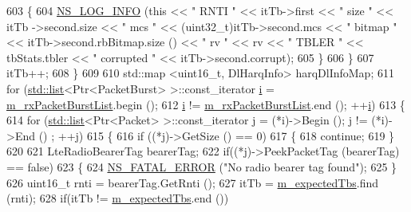 \begin{DoxyCode}
603                         \{
604                                 \hyperlink{group__logging_gafbd73ee2cf9f26b319f49086d8e860fb}{NS\_LOG\_INFO} (\textcolor{keyword}{this} << \textcolor{stringliteral}{" RNTI "} << itTb->first << \textcolor{stringliteral}{" size "} << itTb
      ->second.size << \textcolor{stringliteral}{" mcs "} << (uint32\_t)itTb->second.mcs << \textcolor{stringliteral}{" bitmap "} << itTb->second.rbBitmap.size () << \textcolor{stringliteral}{"
       rv "} << rv << \textcolor{stringliteral}{" TBLER "} << tbStats.tbler << \textcolor{stringliteral}{" corrupted "} << itTb->second.corrupt);
605                         \}
606                 \}
607                 itTb++;
608         \}
609 
610         std::map <uint16\_t, DlHarqInfo> harqDlInfoMap;
611         \textcolor{keywordflow}{for} (\hyperlink{openflow-interface_8h_afd9bcfa176617760671b67580f536fa7}{std::list}<Ptr<PacketBurst> >::const\_iterator \hyperlink{bernuolliDistribution_8m_a6f6ccfcf58b31cb6412107d9d5281426}{i} = 
      \hyperlink{classns3_1_1MmWaveSpectrumPhy_ab57ce6deb73d1e7032276863528fa320}{m\_rxPacketBurstList}.begin ();
612                         \hyperlink{bernuolliDistribution_8m_a6f6ccfcf58b31cb6412107d9d5281426}{i} != \hyperlink{classns3_1_1MmWaveSpectrumPhy_ab57ce6deb73d1e7032276863528fa320}{m\_rxPacketBurstList}.end (); ++\hyperlink{bernuolliDistribution_8m_a6f6ccfcf58b31cb6412107d9d5281426}{i})
613         \{
614                 \textcolor{keywordflow}{for} (\hyperlink{openflow-interface_8h_afd9bcfa176617760671b67580f536fa7}{std::list}<Ptr<Packet> >::const\_iterator j = (*i)->Begin (); j != (*i)->End ()
      ; ++j)
615                 \{
616                         \textcolor{keywordflow}{if} ((*j)->GetSize () == 0)
617                         \{
618                                 \textcolor{keywordflow}{continue};
619                         \}
620 
621                         LteRadioBearerTag bearerTag;
622                         \textcolor{keywordflow}{if}((*j)->PeekPacketTag (bearerTag) == \textcolor{keyword}{false})
623                         \{
624                                 \hyperlink{group__fatal_ga5131d5e3f75d7d4cbfd706ac456fdc85}{NS\_FATAL\_ERROR} (\textcolor{stringliteral}{"No radio bearer tag found"});
625                         \}
626                         uint16\_t rnti = bearerTag.GetRnti ();
627                         itTb = \hyperlink{classns3_1_1MmWaveSpectrumPhy_a596e02208ad8258c0bbc41bb26df7d6c}{m\_expectedTbs}.find (rnti);
628                         \textcolor{keywordflow}{if}(itTb != \hyperlink{classns3_1_1MmWaveSpectrumPhy_a596e02208ad8258c0bbc41bb26df7d6c}{m\_expectedTbs}.end ())

\end{DoxyCode}
